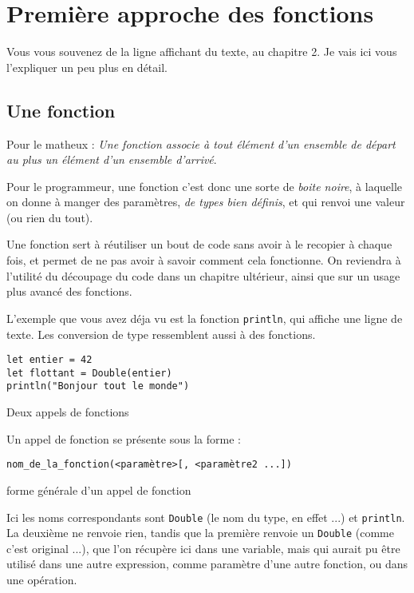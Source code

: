 \section{Première approche des fonctions}
Vous vous souvenez de la ligne affichant du texte, au chapitre 2. Je vais ici vous l'expliquer un peu plus en détail.
\subsection{Une fonction}
Pour le matheux : \emph{Une fonction associe à tout élément d'un ensemble de départ au plus un élément d'un ensemble d'arrivé}.

Pour le programmeur, une fonction c'est donc une sorte de \emph{boite noire}, à laquelle on donne à manger des paramètres, \emph{de types bien définis}, et qui renvoi une valeur (ou rien du tout).

Une fonction sert à réutiliser un bout de code sans avoir à le recopier à chaque fois, et permet de ne pas avoir à savoir comment cela fonctionne.
On reviendra à l'utilité du découpage du code dans un chapitre ultérieur,
ainsi que sur un usage plus avancé des fonctions.

L'exemple que vous avez déja vu est la fonction \texttt{println}, qui affiche une ligne de texte. Les conversion de type ressemblent aussi à des fonctions.

\begin{listing}[h]
\begin{verbatim}
let entier = 42
let flottant = Double(entier)
println("Bonjour tout le monde")
\end{verbatim}
\caption{Deux appels de fonctions}
\end{listing}

Un appel de fonction se présente sous la forme :
\begin{listing}[h]
\begin{verbatim}
nom_de_la_fonction(<paramètre>[, <paramètre2 ...]) 
\end{verbatim}
\caption{forme générale d'un appel de fonction}
\end{listing}

Ici les noms correspondants sont \texttt{Double} (le nom du type, en effet ...) et \texttt{println}. La deuxième ne renvoie rien, tandis que la première renvoie un \texttt{Double} (comme c'est original ...), que l'on récupère ici dans une variable, mais qui aurait pu être utilisé dans une autre expression, comme paramètre d'une autre fonction, ou dans une opération.

